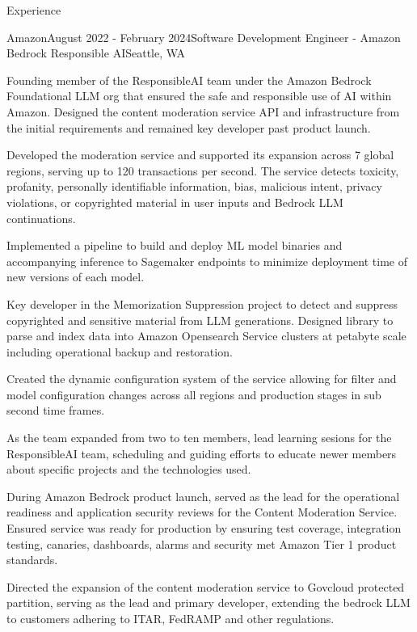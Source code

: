 \documentclass{resume} %
\begin{document}
\begin{rSection}{Experience}
    \begin{rSubsection}{Amazon}{August 2022 - February 2024}{Software Development Engineer - Amazon Bedrock Responsible AI}{Seattle, WA}
      \item Founding member of the ResponsibleAI team under the Amazon Bedrock Foundational LLM org that ensured the safe and responsible use of AI within Amazon. 
    Designed the content moderation service API and infrastructure from the initial requirements and remained key developer past product launch.
      \item Developed the moderation service and supported its expansion across 7 global regions, serving up to 120 transactions per second. The service detects
    toxicity, profanity, personally identifiable information, bias, malicious intent, privacy violations, or copyrighted material in user inputs and Bedrock LLM continuations.
      \item Implemented a pipeline to build and deploy ML model binaries and accompanying inference to Sagemaker endpoints to minimize deployment time of new versions of each model.
      \item Key developer in the Memorization Suppression project to detect and suppress copyrighted and sensitive material from LLM generations. 
    Designed library to parse and index data into Amazon Opensearch Service clusters at petabyte scale including operational backup and restoration.
      \item Created the dynamic configuration system of the service allowing for filter and model configuration changes across all regions and production stages in sub second time frames.
      \item As the team expanded from two to ten members, lead learning sesions for the ResponsibleAI team, scheduling and guiding efforts to educate newer members about specific projects and the technologies used.
      \item During Amazon Bedrock product launch, served as the lead for the operational readiness and application security reviews for the Content Moderation Service. 
    Ensured service was ready for production by ensuring test coverage, integration testing, canaries, dashboards, alarms and security met Amazon Tier 1 product standards.
      \item Directed the expansion of the content moderation service to Govcloud protected partition, serving as the lead and primary developer, extending the bedrock LLM to customers adhering to ITAR, FedRAMP and other regulations.
    \end{rSubsection}
    

\end{rSection}
\end{document}
